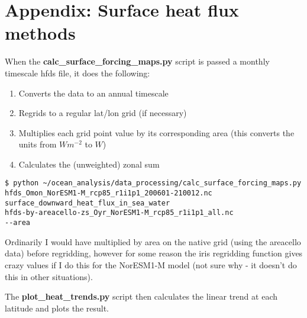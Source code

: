 \section{Appendix: Surface heat flux methods}

When the \textbf{calc_surface_forcing_maps.py} script is passed a monthly timescale hfds file, it does the following:
\begin{enumerate}
\item Converts the data to an annual timescale
\item Regrids to a regular lat/lon grid (if necessary)
\item Multiplies each grid point value by its corresponding area (this converts the units from $Wm^{-2}$ to $W$)
\item Calculates the (unweighted) zonal sum
\end{enumerate}

\begin{verbatim}
$ python ~/ocean_analysis/data_processing/calc_surface_forcing_maps.py
hfds_Omon_NorESM1-M_rcp85_r1i1p1_200601-210012.nc 
surface_downward_heat_flux_in_sea_water 
hfds-by-areacello-zs_Oyr_NorESM1-M_rcp85_r1i1p1_all.nc 
--area
\end{verbatim}

Ordinarily I would have multiplied by area on the native grid (using the areacello data) before regridding, however for some reason the iris regridding function gives crazy values if I do this for the NorESM1-M model (not sure why - it doesn't do this in other situations). 

The \textbf{plot_heat_trends.py} script then calculates the linear trend at each latitude and plots the result.
